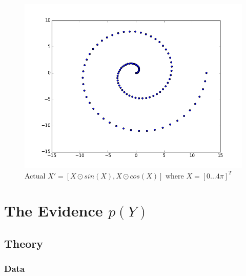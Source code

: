 \documentclass[a4paper,11pt]{article}
\theoremstyle{mytheor}
\begin{document}
\begin{figure}[h]
\centering
\includegraphics[scale =0.75]{actualx}
\caption{Actual $X'= [X\odot sin(X),X \odot cos(X)]$ where $X = [0...4\pi]^T$ }
\label{actual}
\end{figure}
\clearpage




\section{The Evidence $p(Y)$}
\subsection{Theory}
\subsubsection{Data}
\end{document}
